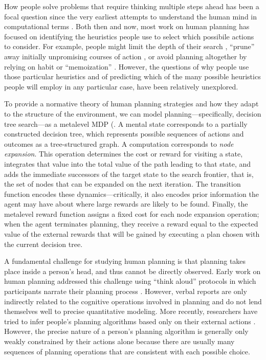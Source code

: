 \documentclass[11pt,a4paperpaper,]{article}
\begin{document}
How people solve problems that require thinking multiple steps ahead has been a focal question since the very earliest attempts to understand the human mind in computational terms \citep{newell1956logic,newell1972human}. Both then and now, most work on human planning has focused on identifying the heuristics people use to select which possibile actions to consider. For example, people might limit the depth of their search \citep{macgregor2001information,keramati2016adaptive,krusche2018adaptive,snider2015prospective}, ``prune'' away initially unpromising courses of action \citep{huys2012bonsai,huys2015interplay}, or avoid planning altogether by relying on habit or ``memoization'' \citep{huys2015interplay,kool2017costbenefit}. However, the questions of why people use those particular heuristics and of predicting which of the many possible heuristics people will employ in any particular case, have been relatively unexplored.

To provide a normative theory of human planning strategies and how they adapt to the structure of the environment, we can model planning---specifically, decision tree search---as a metalevel MDP (. A mental state corresponds to a partially constructed decision tree, which represents possible sequences of actions and outcomes as a tree-structured graph. A computation corresponds to \emph{node expansion}. This operation determines the cost or reward for visiting a state, integrates that value into the total value of the path leading to that state, and adds the immediate successors of the target state to the search frontier, that is, the set of nodes that can be expanded on the next iteration. The transition function encodes these dynamics---critically, it also encodes prior information the agent may have about where large rewards are likely to be found. Finally, the metalevel reward function assigns a fixed cost for each node expansion operation; when the agent terminates planning, they receive a reward equal to the expected value of the external rewards that will be gained by executing a plan chosen with the current decision tree.

A fundamental challenge for studying human planning is that planning takes place inside a person's head, and thus cannot be directly observed. Early work on human planning addressed this challenge using ``think aloud'' protocols in which participants narrate their planning process \citep{degroot1965thought,newell1972human,chase1973perception}. However, verbal reports are only indirectly related to the cognitive operations involved in planning and do not lend themselves well to precise quantitative modeling. More recently, researchers have tried to infer people's planning algorithms based only on their external actions \citep{huys2015interplay,daw2005uncertaintybased,solway2015evidence,vanopheusden2017computational}. However, the precise nature of a person's planning algorithm is generally only weakly constrained by their actions alone because there are usually many sequences of planning operations that are consistent with each possible choice.
\end{document}
